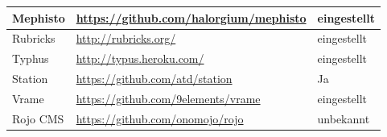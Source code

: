 \begin{table}[!ht]
\begin{tabular}[]{|p{3cm}|p{8cm}|p{4cm}|}
\hline
Mephisto & \href{https://github.com/halorgium/mephisto}{https://github.com/halorgium/mephisto} & eingestellt\\
\hline
Rubricks & \href{http://rubricks.org/}{http://rubricks.org/} & eingestellt\\
\hline
Typhus & \href{http://typus.heroku.com/}{http://typus.heroku.com/} & eingestellt\\
\hline
Station & \href{https://github.com/atd/station}{https://github.com/atd/station} & Ja\\
\hline
Vrame & \href{https://github.com/9elements/vrame}{https://github.com/9elements/vrame} & eingestellt\\
\hline
Rojo CMS & \href{https://github.com/onomojo/rojo}{https://github.com/onomojo/rojo} & unbekannt\\
\hline


\end{tabular}
\end{table}


